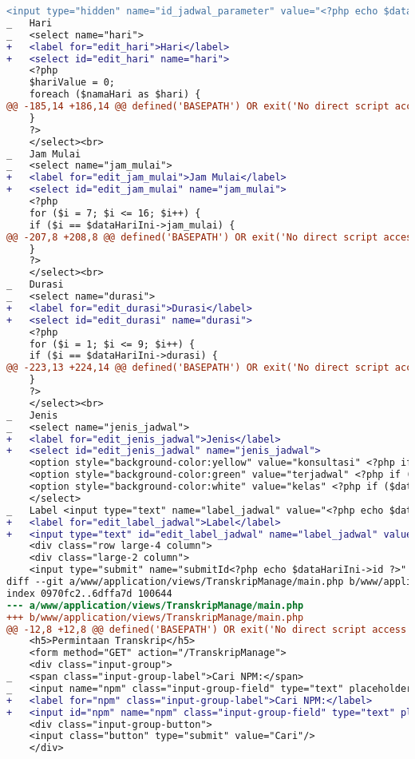 \begin{lstlisting}[frame=single, label={lst:perbaikan_2.5.3_label_dan_nama_pada_komponen_masukan}, language=diff, caption=Perbaikan Kriteria Sukses 2.5.3]
    <input type="hidden" name="id_jadwal_parameter" value="<?php echo $dataHariIni->id ?>"> </a> <br>
_   Hari 
_   <select name="hari"> 
+   <label for="edit_hari">Hari</label>
+   <select id="edit_hari" name="hari"> 
    <?php
    $hariValue = 0;
    foreach ($namaHari as $hari) {
@@ -185,14 +186,14 @@ defined('BASEPATH') OR exit('No direct script access allowed');
    }
    ?>
    </select><br>
_   Jam Mulai
_   <select name="jam_mulai"> 
+   <label for="edit_jam_mulai">Jam Mulai</label>
+   <select id="edit_jam_mulai" name="jam_mulai"> 
    <?php
    for ($i = 7; $i <= 16; $i++) {
    if ($i == $dataHariIni->jam_mulai) {
@@ -207,8 +208,8 @@ defined('BASEPATH') OR exit('No direct script access allowed');
    }
    ?>
    </select><br>
_   Durasi
_   <select name="durasi"> 
+   <label for="edit_durasi">Durasi</label>
+   <select id="edit_durasi" name="durasi"> 
    <?php
    for ($i = 1; $i <= 9; $i++) {
    if ($i == $dataHariIni->durasi) {
@@ -223,13 +224,14 @@ defined('BASEPATH') OR exit('No direct script access allowed');
    }
    ?>
    </select><br>
_   Jenis  
_   <select name="jenis_jadwal"> 
+   <label for="edit_jenis_jadwal">Jenis</label>
+   <select id="edit_jenis_jadwal" name="jenis_jadwal"> 
    <option style="background-color:yellow" value="konsultasi" <?php if ($dataHariIni->jenis == 'konsultasi') echo "selected"; ?> > Konsultasi </option>
    <option style="background-color:green" value="terjadwal" <?php if ($dataHariIni->jenis == 'terjadwal') echo "selected"; ?>> Terjadwal</option>
    <option style="background-color:white" value="kelas" <?php if ($dataHariIni->jenis == 'kelas') echo "selected"; ?>> Kelas </option>
    </select>
_   Label <input type="text" name="label_jadwal" value="<?php echo $dataHariIni->label; ?>"><br> 
+   <label for="edit_label_jadwal">Label</label>
+   <input type="text" id="edit_label_jadwal" name="label_jadwal" value="<?php echo $dataHariIni->label; ?>"><br> 
    <div class="row large-4 column">
    <div class="large-2 column">
    <input type="submit" name="submitId<?php echo $dataHariIni->id ?>" class="button" value="Save  ">
diff --git a/www/application/views/TranskripManage/main.php b/www/application/views/TranskripManage/main.php
index 0970fc2..6dffa7d 100644
--- a/www/application/views/TranskripManage/main.php
+++ b/www/application/views/TranskripManage/main.php
@@ -12,8 +12,8 @@ defined('BASEPATH') OR exit('No direct script access allowed');
    <h5>Permintaan Transkrip</h5>
    <form method="GET" action="/TranskripManage">
    <div class="input-group">
_   <span class="input-group-label">Cari NPM:</span>
_   <input name="npm" class="input-group-field" type="text" placeholder="2013730013" maxlength="10" minlength="10"<?= $npmQuery === NULL ? '' : " value='$npmQuery'" ?>/>
+   <label for="npm" class="input-group-label">Cari NPM:</label>
+   <input id="npm" name="npm" class="input-group-field" type="text" placeholder="2013730013" maxlength="10" minlength="10"<?= $npmQuery === NULL ? '' : " value='$npmQuery'" ?>/>
    <div class="input-group-button">
    <input class="button" type="submit" value="Cari"/>
    </div>
\end{lstlisting} 

